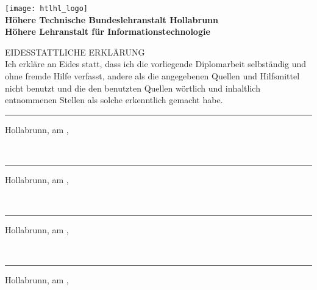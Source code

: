 \begin{center}
	\hfill
	\texttt{[image: htlhl\_logo]} \\
	\vspace{10mm}
	\huge{\textbf{Höhere Technische Bundeslehranstalt Hollabrunn}} \\
	\large{\textbf{Höhere Lehranstalt für Informationstechnologie}} \\
\end{center}

\vspace{10mm}

\large{EIDESSTATTLICHE ERKLÄRUNG} \\
Ich erkläre an Eides statt, dass ich die vorliegende Diplomarbeit selbständig und ohne fremde Hilfe verfasst, andere als die angegebenen Quellen und Hilfsmittel nicht benutzt und die den benutzten Quellen wörtlich und inhaltlich entnommenen Stellen als solche erkenntlich gemacht habe.


\vspace{25mm}
\rule{\textwidth}{1.0pt}
Hollabrunn, am \datumErklaerung , \schuelerA


\if \schuelerB \schuelerEmpty
	~
\else
	\vspace{15mm}
	\rule{\textwidth}{1.0pt}
	Hollabrunn, am \datumErklaerung , \schuelerB
\fi


\if \schuelerC \schuelerEmpty
	~
\else
	\vspace{15mm}
	\rule{\textwidth}{1.0pt}
	Hollabrunn, am \datumErklaerung , \schuelerC
\fi


\if \schuelerD \schuelerEmpty
    ~
\else
	\vspace{15mm}
	\rule{\textwidth}{1.0pt}
	Hollabrunn, am \datumErklaerung , \schuelerD
\fi

